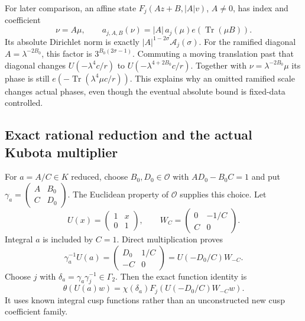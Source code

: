 For later comparison, an affine state
\(F_j(Az+B,|A|v)\), \(A\ne0\), has index and coefficient
\begin{equation}\label{rg:affine-coefficient}
 \nu=A\mu,\qquad
 a_{j,A,B}(\nu)=|A|\,a_j(\mu)e(\operatorname{Tr}(\mu B)).
\end{equation}
Its absolute Dirichlet norm is exactly
\(|A|^{1-2\sigma}\mathcal A_j(\sigma)\).
For the ramified diagonal \(A=\lambda^{-2B_0}\), this factor is
\(3^{B_0(2\sigma-1)}\).
Commuting a moving translation past that diagonal changes
\(U(-\lambda^4c/r)\) to \(U(-\lambda^{4+2B_0}c/r)\).
Together with \(\nu=\lambda^{-2B_0}\mu\) its phase is still
\(e(-\operatorname{Tr}(\lambda^4\mu c/r))\).
This explains why an omitted ramified scale changes actual phases,
even though the eventual absolute bound is fixed-data controlled.

\subsection{Exact rational reduction and the actual Kubota multiplier}
\label{rg:rational-construction}
For \(a=A/C\in K\) reduced, choose \(B_0,D_0\in\mathcal O\) with
\(AD_0-B_0C=1\) and put
\(\gamma_a=\left(\begin{smallmatrix}A&B_0\\C&D_0\end{smallmatrix}\right)\).
The Euclidean property of \(\mathcal O\) supplies this choice.
Let
\[
 U(x)=\begin{pmatrix}1&x\\0&1\end{pmatrix},\qquad
 W_C=\begin{pmatrix}0&-1/C\\C&0\end{pmatrix}.
\]
Integral \(a\) is included by \(C=1\).
Direct multiplication proves
\begin{equation}\label{rg:rational-matrix}
 \gamma_a^{-1}U(a)
 =\begin{pmatrix}D_0&1/C\\-C&0\end{pmatrix}
 =U(-D_0/C)W_{-C}.
\end{equation}
Choose \(j\) with \(\delta_a=\gamma_a\gamma_j^{-1}\in\Gamma_2\).
Then the exact function identity is
\begin{equation}\label{rg:rational-theta}
 \theta(U(a)w)
 =\chi(\delta_a)F_j(U(-D_0/C)W_{-C}w).
\end{equation}
It uses known integral cusp functions rather than an unconstructed
new cusp coefficient family.

